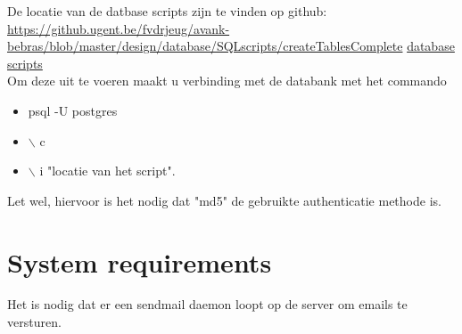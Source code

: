 \documentclass[10pt,a4paper]{article}
\begin{document}
De locatie van de datbase scripts zijn te vinden op github:
\url{https://github.ugent.be/fvdrjeug/avank-bebras/blob/master/design/database/SQLscripts/createTablesComplete}
\href{https://github.ugent.be/fvdrjeug/avank-bebras/blob/master/design/database/SQLscripts/createTablesComplete}{database scripts}\\

Om deze uit te voeren maakt u verbinding met de databank met het commando
\begin{itemize}
\item psql -U postgres
\item $\backslash$ c
\item $\backslash$ i "locatie van het script".
\end{itemize} 
Let wel, hiervoor is het nodig dat "md5" de gebruikte authenticatie methode is.

\section*{System requirements}
Het is nodig dat er een sendmail daemon loopt op de server om emails te versturen.
\end{document}
